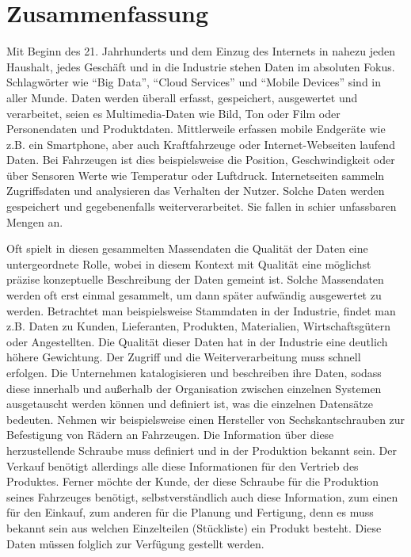 \chapter*{Zusammenfassung}


Mit Beginn des 21. Jahrhunderts und dem Einzug des Internets in nahezu jeden Haushalt, jedes Geschäft und in die Industrie stehen Daten im absoluten Fokus. Schlagwörter wie \enquote{Big Data}, \enquote{Cloud Services} und \enquote{Mobile Devices} sind in aller Munde. Daten werden überall erfasst, gespeichert, ausgewertet und verarbeitet, seien es Multimedia-Daten wie Bild, Ton oder Film oder Personendaten und Produktdaten. Mittlerweile erfassen mobile Endgeräte wie z.B. ein Smartphone, aber auch Kraftfahrzeuge oder Internet-Webseiten laufend Daten. Bei Fahrzeugen ist dies beispielsweise die Position, Geschwindigkeit oder über Sensoren Werte wie Temperatur oder Luftdruck. Internetseiten sammeln Zugriffsdaten und analysieren das Verhalten der Nutzer. Solche Daten werden gespeichert und gegebenenfalls weiterverarbeitet. Sie fallen in schier unfassbaren Mengen an. 

Oft spielt in diesen gesammelten Massendaten die Qualität der Daten eine untergeordnete Rolle, wobei in diesem Kontext mit Qualität eine möglichst präzise konzeptuelle Beschreibung der Daten gemeint ist. Solche Massendaten werden oft erst einmal gesammelt, um dann später aufwändig ausgewertet zu werden.
Betrachtet man beispielsweise Stammdaten in der Industrie, findet man z.B. Daten zu Kunden, Lieferanten, Produkten, Materialien, Wirtschaftsgütern oder Angestellten. Die Qualität dieser Daten hat in der Industrie eine deutlich höhere Gewichtung. Der Zugriff und die Weiterverarbeitung muss schnell erfolgen. Die Unternehmen katalogisieren und beschreiben ihre Daten, sodass diese innerhalb und außerhalb der Organisation zwischen einzelnen Systemen ausgetauscht werden können und definiert ist, was die einzelnen Datensätze bedeuten. Nehmen wir beispielsweise einen Hersteller von Sechskantschrauben zur Befestigung von Rädern an Fahrzeugen. Die Information über diese herzustellende Schraube muss definiert und in der Produktion bekannt sein. Der Verkauf benötigt allerdings alle diese Informationen für den Vertrieb des Produktes. Ferner möchte der Kunde, der diese Schraube für die Produktion seines Fahrzeuges benötigt, selbstverständlich auch diese Information, zum einen für den Einkauf, zum anderen für die Planung und Fertigung, denn es muss bekannt sein aus welchen Einzelteilen (Stückliste) ein Produkt besteht. Diese Daten müssen folglich zur Verfügung gestellt werden. 


